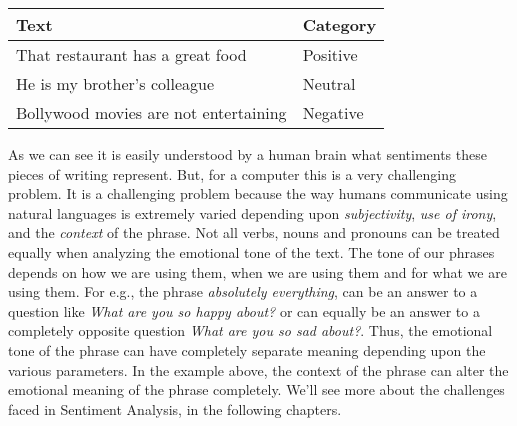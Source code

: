 \documentclass[a4paper, 12pt]{article}
\begin{document}
\begin{sloppypar}
\begin{table}[H]
\begin{tabularx}{\columnwidth}{| X | X |}
\hline
Text & Category \\ [0.5ex]
\hline
\hline
That restaurant has a great food & Positive \\ [0.5ex]
\hline
He is my brother's colleague & Neutral \\ [0.5ex]
\hline
Bollywood movies are not entertaining & Negative \\ [0.5ex]
\hline
\end{tabularx}
\end{table}

As we can see it is easily understood by a human brain what sentiments these pieces of writing represent. But, for a computer this is a very challenging problem. It is a challenging problem because the way humans communicate using natural languages is extremely varied depending  upon \textit{subjectivity}, \textit{use of irony}, and the \textit{context} of the phrase. Not all verbs, nouns and pronouns can be treated equally when analyzing the emotional tone of the text. The tone of our phrases depends on how we are using them, when we are using them and for what we are using them. For e.g., the phrase \textit{absolutely everything}, can be an answer to a question like \textit{What are you so happy about?} or can equally be an answer to a completely opposite  question \textit{What are you so sad about?}. Thus, the emotional tone of the phrase can have completely separate meaning depending upon the various parameters. In the example above, the context of the phrase can alter the emotional meaning of the phrase completely. We'll see more about the challenges faced in Sentiment Analysis, in the following chapters.


\end{sloppypar}
\end{document}
